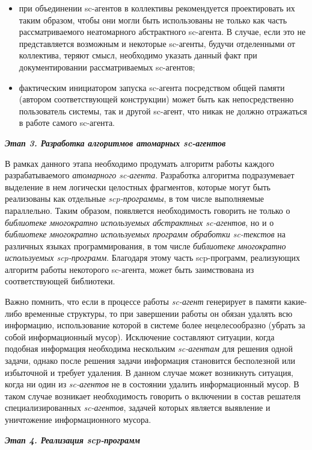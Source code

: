 \begin{itemize}
\item при объединении sc-агентов в коллективы рекомендуется проектировать их таким образом, чтобы они могли быть использованы не только как часть рассматриваемого неатомарного абстрактного sc-агента. В случае, если это не представляется возможным и некоторые sc-агенты, будучи отделенными от коллектива, теряют смысл, необходимо указать данный факт при документировании рассматриваемых sc-агентов;
\item фактическим инициатором запуска sc-агента посредством общей памяти (автором соответствующей конструкции) может быть как непосредственно пользователь системы, так и другой sc-агент, что никак не должно отражаться в работе самого sc-агента.
\end{itemize}

\textbf{\textit{Этап 3. Разработка алгоритмов атомарных sc-агентов}}

В рамках данного этапа необходимо продумать алгоритм работы каждого разрабатываемого \textit{атомарного sc-агента}. Разработка алгоритма подразумевает выделение в нем логически целостных фрагментов, которые могут быть реализованы как отдельные \textit{scp-программы}, в том числе выполняемые параллельно. Таким образом, появляется необходимость говорить не только о \textit{библиотеке многократно используемых абстрактных sc-агентов}, но и о \textit{библиотеке многократно используемых программ обработки sc-текстов} на различных языках программирования, в том числе \textit{библиотеке многократно используемых scp-программ}. Благодаря этому часть scp-программ, реализующих алгоритм работы некоторого sc-агента, может быть заимствована из соответствующей библиотеки.

Важно помнить, что если в процессе работы \textit{sc-агент} генерирует в памяти какие-либо временные структуры, то при завершении работы он обязан удалять всю информацию, использование которой в системе более нецелесообразно (убрать за собой информационный мусор). Исключение составляют ситуации, когда подобная информация необходима нескольким \textit{sc-агентам} для решения одной задачи, однако после решения задачи информация становится бесполезной или избыточной и требует удаления. В данном случае может возникнуть ситуация, когда ни один из \textit{sc-агентов} не в состоянии удалить информационный мусор. В таком случае возникает необходимость говорить о включении в состав решателя специализированных \textit{sc-агентов}, задачей которых является выявление и уничтожение информационного мусора.

\textbf{\textit{Этап 4. Реализация scp-программ}}

